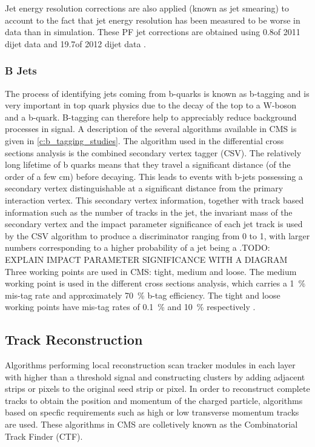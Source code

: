 Jet energy resolution corrections are also applied (known as jet smearing) to account to the fact that jet
energy resolution has been measured to be worse in data than in simulation. These PF jet corrections are
obtained using 0.8\fbinv of 2011 dijet data and 19.7\fbinv of 2012 dijet data
\cite{Chatrchyan:2011ds,jet_res_2012}.

\subsubsection{B Jets}
\label{sss:b_jets}
The process of identifying jets coming from b-quarks is known as b-tagging and is very important in top quark
physics due to the decay of the top to a W-boson and a b-quark. B-tagging can therefore help to appreciably
reduce background processes in signal. A description of the several algorithms available in CMS is given in
\ref{c:b_tagging_studies}. The algorithm used in the differential cross sections analysis is the combined
secondary vertex tagger (CSV). The relatively long lifetime of b quarks means that they travel a significant
distance (of the order of a few cm) before decaying. This leads to events with b-jets possessing a
secondary vertex distinguishable at a significant distance from the primary interaction vertex. This secondary vertex
information, together with track based information such as the number of tracks in the jet, the invariant
mass of the secondary vertex and the impact parameter significance of each jet track is used by the CSV
algorithm to produce a discriminator ranging from 0 to 1, with larger numbers corresponding to a higher
probability of a jet being a \bjet.TODO: EXPLAIN IMPACT PARAMETER SIGNIFICANCE WITH A DIAGRAM
Three working points are used in CMS: tight, medium and loose. The medium working point is used in the different
cross sections analysis, which carries a 1~\% mis-tag rate and approximately 70~\% b-tag efficiency. The tight
and loose working points have mis-tag rates of 0.1~\% and 10~\% respectively \cite{btagging}.

\subsection{Track Reconstruction}
\label{ss:track_reconstruction}
Algorithms performing local reconstruction scan tracker modules in each layer with higher than a threshold
signal and constructing clusters by adding adjacent strips or pixels to the original seed strip or pixel. In
order to reconstruct complete tracks to obtain the position and momentum of the charged particle, algorithms
based on specfic requirements such as high or low transverse momentum tracks are used. These algorithms in CMS
are colletively known as the Combinatorial Track Finder (CTF).

